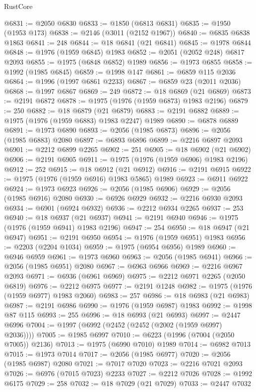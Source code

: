 \begin{lexlean}{RustCore}
\begin{coremodule}
@6831 := @2050 @6830
@6833 := @1850 (@6813 @6831)
@6835 := @1950 (@1953 @173)
@6838 := @2146 (@3011 (@2152 @1967))
@6840 := @6835 @6838 @1863
@6841 := 248
@6844 := @18 @6841 (@21 @6841)
@6845 := @1978 @6844
@6848 := @1976 (@1959 @6845) @1983
@6852 := @2051 (@2052 @248) @6817 @2093
@6855 := @1975 (@6848 @6852) @1989
@6856 := @1973 @6855
@6858 := @1992 (@1985 @6845)
@6859 := @1998 @147
@6861 := @6859 @115 @2036
@6864 := @1996 (@1997 @6861 @2233)
@6867 := @6859 @23 (@2011 @2036)
@6868 := @1997 @6867
@6869 := 249
@6872 := @18 @6869 (@21 @6869)
@6873 := @2191 @6872
@6878 := @1975 (@1976 (@1959 @6873) @1983 @2196)
@6879 := 250
@6882 := @18 @6879 (@21 @6879)
@6883 := @2191 @6882
@6889 := @1975 (@1976 (@1959 @6883) @1983 @2247) @1989
@6890 := @6878 @6889
@6891 := @1973 @6890
@6893 := @2056 (@1985 @6873)
@6896 := @2056 (@1985 @6883) @2080
@6897 := @6893 @6896
@6899 := @2216 @6897 @2093
@6901 := @2212 @6899 @2265
@6902 := 251
@6905 := @18 @6902 (@21 @6902)
@6906 := @2191 @6905
@6911 := @1975 (@1976 (@1959 @6906) @1983 @2196)
@6912 := 252
@6915 := @18 @6912 (@21 @6912)
@6916 := @2191 @6915
@6922 := @1975 (@1976 (@1959 @6916) @1983 @5865) @1989
@6923 := @6911 @6922
@6924 := @1973 @6923
@6926 := @2056 (@1985 @6906)
@6929 := @2056 (@1985 @6916) @2080
@6930 := @6926 @6929
@6932 := @2216 @6930 @2093
@6934 := @6901 (@6924 @6932)
@6936 := @2212 @6934 @2265
@6937 := 253
@6940 := @18 @6937 (@21 @6937)
@6941 := @2191 @6940
@6946 := @1975 (@1976 (@1959 @6941) @1983 @2196)
@6947 := 254
@6950 := @18 @6947 (@21 @6947)
@6951 := @2191 @6950
@6954 := @1976 (@1959 @6951) @1983
@6956 := @2203 (@2204 @1034)
@6959 := @1975 (@6954 @6956) @1989
@6960 := @6946 @6959
@6961 := @1973 @6960
@6963 := @2056 (@1985 @6941)
@6966 := @2056 (@1985 @6951) @2080
@6967 := @6963 @6966
@6969 := @2216 @6967 @2093
@6971 := @6936 (@6961 @6969)
@6975 := @2212 @6971 @2265 (@2050 @6819)
@6976 := @2212 @6975
@6977 := @2191 @1248
@6982 := @1975 (@1976 (@1959 @6977) @1983 @2060)
@6983 := 257
@6986 := @18 @6983 (@21 @6983)
@6987 := @2191 @6986
@6990 := @1976 (@1959 @6987) @1983
@6992 := @1998 @87 @115
@6993 := 255
@6996 := @18 @6993 (@21 @6993)
@6997 := @2447 @6996
@7004 := @1997 (@6992 (@2452 (@2452 (@2002 (@1959 @6997) @2036))))
@7005 := @1985 @6997
@7010 := @6223 (@1996 (@7004 (@2050 @7005)) @2136)
@7013 := @1975 (@6990 @7010) @1989
@7014 := @6982 @7013
@7015 := @1973 @7014
@7017 := @2056 (@1985 @6977)
@7020 := @2056 (@1985 @6987) @2080
@7021 := @7017 @7020
@7023 := @2216 @7021 @2093
@7026 := @6976 (@7015 @7023) @2233
@7027 := @2212 @7026
@7028 := @1992 @6175
@7029 := 258
@7032 := @18 @7029 (@21 @7029)
@7033 := @2447 @7032

\end{coremodule}
\end{lexlean}
